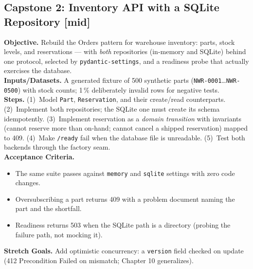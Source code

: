 \subsection{Capstone 2: Inventory API with a SQLite Repository [mid]}
\textbf{Objective.} Rebuild the Orders pattern for warehouse inventory:
parts, stock levels, and reservations --- with \emph{both} repositories
(in-memory and SQLite) behind one protocol, selected by
\texttt{pydantic-settings}, and a readiness probe that actually exercises the
database.\\
\textbf{Inputs/Datasets.} A generated fixture of 500 synthetic parts
(\texttt{NWR-0001}\ldots\texttt{NWR-0500}) with stock counts; 1\,\%
deliberately invalid rows for negative tests.\\
\textbf{Steps.} (1)~Model \texttt{Part}, \texttt{Reservation}, and their
create/read counterparts. (2)~Implement both repositories; the SQLite one
must create its schema idempotently. (3)~Implement reservation as a
\emph{domain transition} with invariants (cannot reserve more than on-hand;
cannot cancel a shipped reservation) mapped to 409. (4)~Make \texttt{/ready}
fail when the database file is unreadable. (5)~Test both backends through
the factory seam.\\
\textbf{Acceptance Criteria.}
\begin{itemize}
  \item[$\square$] The same suite passes against \texttt{memory} and
        \texttt{sqlite} settings with zero code changes.
  \item[$\square$] Oversubscribing a part returns 409 with a problem document
        naming the part and the shortfall.
  \item[$\square$] Readiness returns 503 when the SQLite path is a directory
        (probing the failure path, not mocking it).
\end{itemize}
\textbf{Stretch Goals.} Add optimistic concurrency: a \texttt{version} field
checked on update (412 Precondition Failed on mismatch; Chapter 10
generalizes).

